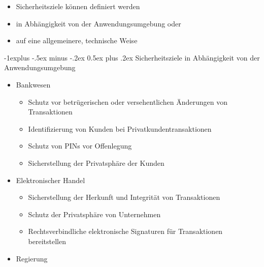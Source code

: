 \documentclass[a4paper]{article}
\makeatletter
\renewcommand{\subsection}{\@startsection{subsection}{2}{0mm}%
 {-1explus -.5ex minus -.2ex}%
 {0.5ex plus .2ex}%
 {\normalfont\normalsize\bfseries}}
\makeatother
\begin{document}
\begin{multicols}{3}
\begin{itemize}
              \begin{itemize}
                  \item
                        Sicherheitsziele können definiert werden
                  \item
                        in Abhängigkeit von der Anwendungsumgebung oder
                  \item
                        auf eine allgemeinere, technische Weise
              \end{itemize}
    \end{itemize}


    \subsection{Sicherheitsziele in Abhängigkeit von der
        Anwendungsumgebung}

    \begin{itemize}
        \item
              Bankwesen

              \begin{itemize}
                  \item
                        Schutz vor betrügerischen oder versehentlichen Änderungen von
                        Transaktionen
                  \item
                        Identifizierung von Kunden bei Privatkundentransaktionen
                  \item
                        Schutz von PINs vor Offenlegung
                  \item
                        Sicherstellung der Privatsphäre der Kunden
              \end{itemize}
        \item
              Elektronischer Handel

              \begin{itemize}
                  \item
                        Sicherstellung der Herkunft und Integrität von Transaktionen
                  \item
                        Schutz der Privatsphäre von Unternehmen
                  \item
                        Rechtsverbindliche elektronische Signaturen für Transaktionen
                        bereitstellen
              \end{itemize}
        \item
              Regierung


\end{itemize}
\end{multicols}
\end{document}
